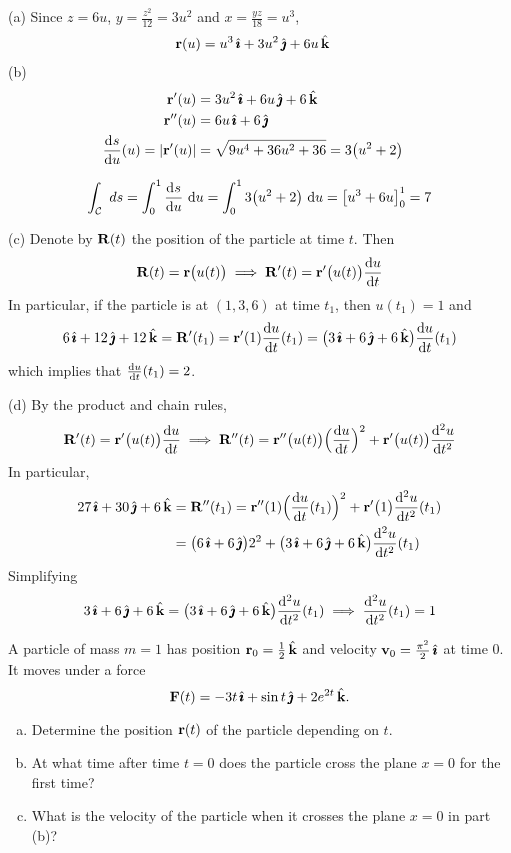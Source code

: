\begin{solution}
(a) 
Since $z=6u$, $y=\frac{z^2}{12}=3u^2$ and $x=\frac{yz}{18}=u^3$,
\begin{align*}
\mathbf{r}(u)&=u^3\,\hat{\pmb{\imath}}+3u^2\,\hat{\pmb{\jmath}}+6u\,\hat{\mathbf{k}}\cr
\end{align*}
(b)
\begin{align*}
\vr'(u)&=3u^2\,\hi+6u\,\hj+6\,\hk\cr
\vr''(u)&=6u\,\hi+6\,\hj\cr
\diff{s}{u}(u)=|\vr'(u)|
&=\sqrt{9u^4+36u^2+36}=3\big(u^2+2\big)\cr
\end{align*}


$$
\int_\cC \ ds
=\int_0^1 \diff{s}{u}\ \dee{u}
=\int_0^1 3\big(u^2+2\big)\ \dee{u}
=\big[u^3+6u\big]_0^1
=7
$$

(c) Denote by $\mathbf{R}(t)$ the position of the particle at time $t$.
Then
$$
\vR(t)=\vr\big(u(t)\big)\implies
\vR'(t)=\vr'\big(u(t)\big)\diff{u}{t}
$$
In particular, if the particle is at $(1,3,6)$ at time $t_1$, then $u(t_1)=1$
and
$$
6\,\hi+12\,\hj+12\,\hk=\vR'(t_1)=\vr'(1)\diff{u}{t}(t_1)
=\big(3\,\hi+6\,\hj+6\,\hk\big)\diff{u}{t}(t_1)
$$
which implies that $\diff{u}{t}(t_1)=2$.

(d) By the product and chain rules,
$$
\vR'(t)=\vr'\big(u(t)\big)\diff{u}{t}\implies
\vR''(t)=\vr''\big(u(t)\big)\Big(\diff{u}{t}\Big)^2
+\vr'\big(u(t)\big)\difftwo{u}{t}
$$
In particular,
\begin{align*}
27\,\hi+30\,\hj+6\,\hk
&=\vR''(t_1)=\vr''(1)\Big(\diff{u}{t}(t_1)\Big)^2
+\vr'\big(1\big)\difftwo{u}{t}(t_1) \\
&=\big(6\,\hi+6\,\hj\big)2^2+\big(3\,\hi+6\,\hj+6\,\hk\big)\difftwo{u}{t}(t_1)
\end{align*}
Simplifying
$$
3\,\hi+6\,\hj+6\,\hk
=\big(3\,\hi+6\,\hj+6\,\hk\big)\difftwo{u}{t}(t_1)
\implies \difftwo{u}{t}(t_1)=1
$$
\end{solution}


\begin{question}[M317 2008A] %
A particle of mass $m = 1$ has position $\mathbf{r}_0 = \frac{1}{2}\,\hat{\mathbf{k}}$ 
and velocity $\mathbf{v}_0 =\frac{\pi^2}{2}\,\hat{\pmb{\imath}}$ at time $0$.
It moves under a force
\begin{equation*}
\mathbf{F}(t) = -3t\,\hat{\pmb{\imath}} + \sin t\,\hat{\pmb{\jmath}} + 2e^{2t}\,\hat{\mathbf{k}}.
\end{equation*}
\begin{enumerate}[(a)]
\item
Determine the position $\mathbf{r}(t)$ of the particle depending on $t$.
\item
At what time after time $t = 0$ does the particle cross the plane 
$x = 0$ for the first time?
\item
What is the velocity of the particle when it crosses the plane $x = 0$ 
in part (b)?
\end{enumerate}
\end{question}

